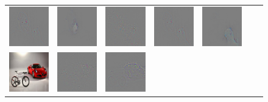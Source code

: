 \begin{figure}
\begin{center}
\begin{tabular}{ccccccc}
\includegraphics[width=0.14\linewidth,height=0.115\linewidth]{figs/examples/googlenet/deconv/dog-cat4_diff_243} &
\includegraphics[width=0.14\linewidth,height=0.115\linewidth]{figs/examples/googlenet/soft/dog-cat4_diff_243} &
\includegraphics[width=0.14\linewidth,height=0.115\linewidth]{figs/examples/googlenet/oxford/dog-cat4_diff_286} &
\includegraphics[width=0.14\linewidth,height=0.115\linewidth]{figs/examples/googlenet/deconv/dog-cat4_diff_286} &
\includegraphics[width=0.14\linewidth,height=0.115\linewidth]{figs/examples/googlenet/soft/dog-cat4_diff_286} \\
\vspace{-2.5pt}
\includegraphics[width=0.14\linewidth,height=0.115\linewidth]{figs/examples/googlenet/oxford/bic-car1} &
\includegraphics[width=0.14\linewidth,height=0.115\linewidth]{figs/examples/googlenet/oxford/bic-car1_diff_818} &
\includegraphics[width=0.14\linewidth,height=0.115\linewidth]{figs/examples/googlenet/deconv/bic-car1_diff_818} &

\end{tabular}
\end{center}
\end{figure}
